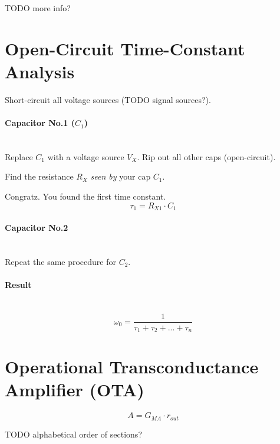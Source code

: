 \documentclass[twocolumn]{article}
\begin{document}
    TODO more info?

  \section{Open-Circuit Time-Constant Analysis}
    Short-circuit all voltage sources (TODO signal sources?).

    \paragraph{Capacitor No.1 ($C_1$)} \hfill \\
      Replace $C_1$ with a voltage source $V_X$.
      Rip out all other caps (open-circuit).
  
      Find the resistance $R_X$ \emph{seen by} your cap $C_1$.
  
      Congratz. You found the first time constant.
      $$\tau_1 = R_{X1} \cdot C_1$$

    \paragraph{Capacitor No.2} \hfill \\
      Repeat the same procedure for $C_2$.

    \paragraph{Result} \hfill \\
      $$\omega_0 = \frac{1}{\tau_1 + \tau_2 + ... + \tau_n}$$

  \section{Operational Transconductance Amplifier (OTA)}
    $$A = G_{MA} \cdot r_{out}$$

  TODO alphabetical order of sections?
\end{document}
